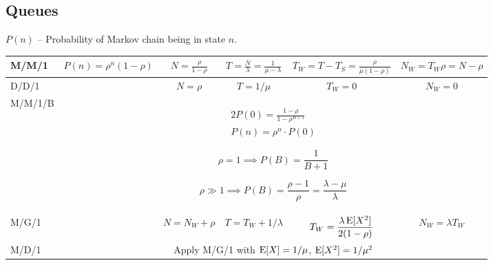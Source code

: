 \documentclass{form}
\begin{document}
\subsection*{Queues}
$P(n)$ -- Probability of Markov chain being in state $n$.
\begin{center}
    \begin{tabular}{l || c | c | c | c | c }
        M/M/1   & $\displaystyle P(n) = \rho^n(1-\rho)$   & $\displaystyle N=\frac{\rho}{1-\rho}$ & $\displaystyle T=\frac{N}{\lambda} = \frac{1}{\mu-\lambda}$ & $\displaystyle T_W = T-T_S = \frac{\rho}{\mu(1-\rho)}$ & $\displaystyle N_W = T_W \rho = N-\rho$ \\ \hline
        D/D/1   &                                         & $\displaystyle N=\rho$                & $\displaystyle T=1/\mu$                                     & $\displaystyle T_W = 0$                                & $\displaystyle N_W = 0$                 \\ \hline
        M/M/1/B & \multicolumn{5}{c}{
            \begin{minipage}{0.15\textwidth}
                \vspace{-0.8em}
                \begin{alignat*}{2}
                    P(0) = \frac{1-\rho}{1-\rho^{B+1}} \\
                    P(n) = \rho^n\cdot P(0)
                \end{alignat*}
            \end{minipage}
            \begin{minipage}{0.35\textwidth}
                \vspace{-0.8em}
                \begin{equation*}
                    \rho = 1 \implies P(B) = \frac{1}{B+1}
                \end{equation*}
            \end{minipage}
            \begin{minipage}{0.30\textwidth}
                \vspace{-0.8em}
                \begin{equation*}
                    \rho \gg 1 \implies P(B) = \frac{\rho-1}{\rho} = \frac{\lambda - \mu}{\lambda}
                \end{equation*}
            \end{minipage}
        } \\ \hline
        M/G/1   &                                         & $\displaystyle N=N_W + \rho$                & $\displaystyle T=T_W+1/\lambda$                             & $\displaystyle T_W = \frac{\lambda \operatorname{E}[X^2]}{2(1-\rho)}$                    & $\displaystyle N_W = \lambda T_W$                 \\ \hline
        M/D/1   & \multicolumn{5}{c}{Apply M/G/1 with $\operatorname{E}[X]=1/\mu$, $\operatorname{E}[X^2]=1/\mu^2$ }  \\ \hline
    \end{tabular}
\end{center}
\end{document}
